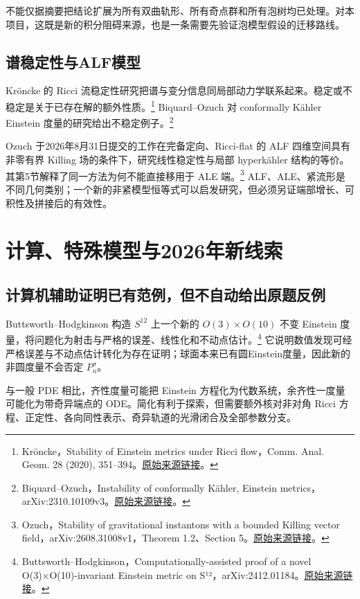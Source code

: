 \documentclass[11pt,a4paper]{article}
\theoremstyle{definition}
\newcommand{\src}[3]{\footnote{\raggedright #1，#2。\href{#3}{原始来源链接}。}}
\begin{document}
不能仅据摘要把结论扩展为所有双曲轨形、所有奇点群和所有泡树均已处理。对本项目，这既是新的积分阻碍来源，也是一条需要先验证泡模型假设的迁移路线。

\subsection{谱稳定性与ALF模型}

Kröncke 的 Ricci 流稳定性研究把谱与变分信息同局部动力学联系起来。稳定或不稳定是关于已存在解的额外性质。\src{Kröncke}{Stability of Einstein metrics under Ricci flow，Comm. Anal. Geom. 28 (2020), 351--394}{https://doi.org/10.4310/CAG.2020.v28.n2.a5}
Biquard--Ozuch 对 conformally Kähler Einstein 度量的研究给出不稳定例子。\src{Biquard--Ozuch}{Instability of conformally Kähler, Einstein metrics，arXiv:2310.10109v3}{https://arxiv.org/abs/2310.10109v3}

Ozuch 于2026年8月31日提交的工作在完备定向、Ricci-flat 的 ALF 四维空间具有非零有界 Killing 场的条件下，研究线性稳定性与局部 hyperkähler 结构的等价。其第5节解释了同一方法为何不能直接移用于 ALE 端。\src{Ozuch}{Stability of gravitational instantons with a bounded Killing vector field，arXiv:2608.31008v1，Theorem 1.2、Section 5}{https://arxiv.org/html/2608.31008v1}
ALF、ALE、紧流形是不同几何类别；一个新的非紧模型恒等式可以启发研究，但必须另证端部增长、可积性及拼接后的有效性。

\section{计算、特殊模型与2026年新线索}

\subsection{计算机辅助证明已有范例，但不自动给出原题反例}

Buttsworth--Hodgkinson 构造 $S^{12}$ 上一个新的 $O(3)\times O(10)$ 不变 Einstein 度量，将问题化为射击与严格的误差、线性化和不动点估计。\src{Buttsworth--Hodgkinson}{Computationally-assisted proof of a novel O(3)×O(10)-invariant Einstein metric on S¹²，arXiv:2412.01184}{https://arxiv.org/abs/2412.01184}
它说明数值发现可经严格误差与不动点估计转化为存在证明；球面本来已有圆Einstein度量，因此新的非圆度量不会否定 $P_n^\sigma$。

与一般 PDE 相比，齐性度量可能把 Einstein 方程化为代数系统，余齐性一度量可能化为带奇异端点的 ODE。简化有利于探索，但需要额外核对非对角 Ricci 方程、正定性、各向同性表示、奇异轨道的光滑闭合及全部参数分支。
\end{document}
